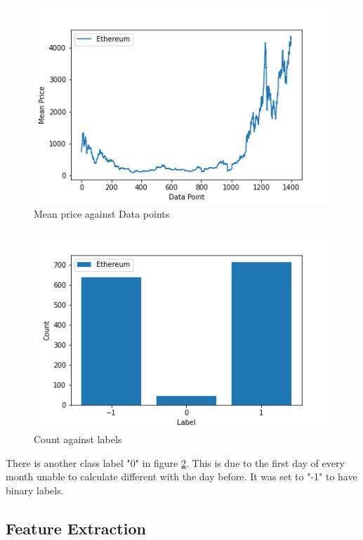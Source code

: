\documentclass[transmag]{IEEEtran}
\begin{document}
\begin{figure}[h]
	\includegraphics[width=\columnwidth]{binance_mean_price.png} 
    \caption{Mean price against Data points}%
    \label{fig:binance_overview_mean_price}%
\end{figure}

\begin{figure}[h]
	\includegraphics[width=\columnwidth]{binance_label.png} 
    \caption{Count against labels}%
    \label{fig:binance_overview_count}%
\end{figure}

\noindent There is another class label "0" in figure \ref{fig:binance_overview_count}. This is due to the first day of every month unable to calculate different with the day before. It was set to "-1" to have binary labels.

\subsection{Feature Extraction}
\end{document}
